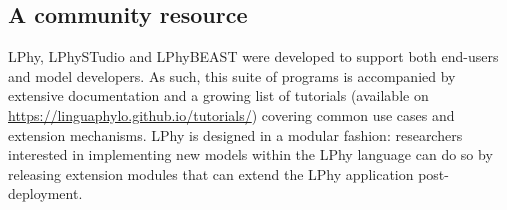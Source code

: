 \documentclass[10pt,letterpaper,table]{article}
\begin{document}
\subsection{A community resource}
LPhy, LPhySTudio and LPhyBEAST were developed to support both end-users and model developers.
As such, this suite of programs is accompanied by extensive documentation and a growing list of tutorials (available on \url{https://linguaphylo.github.io/tutorials/}) covering common use cases and extension mechanisms.
LPhy is designed in a modular fashion: researchers interested in implementing new models within the LPhy language can do so by releasing extension modules that can extend the LPhy application post-deployment.




\end{document}
